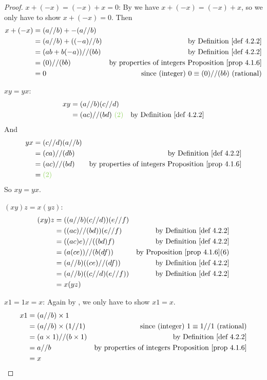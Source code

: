 \begin{proof}
 \(x + (-x) = (-x) + x = 0\):
By  we have \(x + (-x) = (-x) + x\), so we only have to show \(x + (-x) = 0\).
Then
\begin{align*}
    x + (-x) & = (a \D b) + -(a \D b) \\
             & = (a \D b) + ((-a) \D b) & \text{by \DEF{4.2.2}} \\
             & = (ab + b(-a)) \D (bb) & \text{by \DEF{4.2.2}} \\
             & = (0) \D (bb) & \text{by properties of integers \PROP{4.1.6}} \\
             & = 0 & \text{since (integer) \( 0 \equiv (0) \D (bb)\) (rational)}
\end{align*}

 \(xy = yx\):
\begin{align*}
    xy & = (a \D b)(c \D d) \\
       & = (ac) \D (bd) \text{\ \GREEN{(2)}} & \text{by \DEF{4.2.2}}
\end{align*}
And 
\begin{align*}
    yx & = (c \D d)(a \D b) \\
       & = (ca) \D (db) & \text{by \DEF{4.2.2}} \\
       & = (ac) \D (bd) & \text{by properties of integers \PROP{4.1.6}} \\
       & = \text{\GREEN{(2)}}
\end{align*}
So \(xy = yx\).

 \((xy)z = x(yz)\):
\begin{align*}
    (xy)z & = ((a \D b)(c \D d))(e \D f) \\
          & = ((ac) \D (bd))(e \D f) & \text{by \DEF{4.2.2}} \\
          & = ((ac)e) \D ((bd)f) & \text{by \DEF{4.2.2}} \\
          & = (a(ce)) \D (b(df)) & \text{by \PROP{4.1.6}(6)} \\
          & = (a \D b)((ce) \D (df)) & \text{by \DEF{4.2.2}} \\
          & = (a \D b)((c \D d)(e \D f)) & \text{by \DEF{4.2.2}} \\
          & = x(yz)
\end{align*}

 \(x1 = 1x = x\):
Again by , we only have to show \(x1 = x\).
\begin{align*}
    x1 & = (a \D b) \X 1 \\
       & = (a \D b) \X (1 \D 1) & \text{since (integer) \(1 \equiv 1 \D 1\) (rational)} \\
       & = (a \X 1) \D (b \X 1) & \text{by \DEF{4.2.2}} \\
       & = a \D b & \text{by properties of integers \PROP{4.1.6}} \\
       & = x
\end{align*}


\end{proof}
